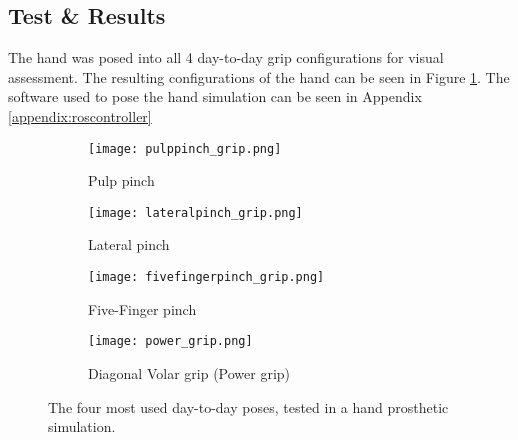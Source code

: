 \documentclass[../main.tex]{subfiles}
\begin{document}
\subsection{Test \& Results}

The hand was posed into all 4 day-to-day grip configurations for visual assessment.
The resulting configurations of the hand can be seen in Figure  \ref{fig:hand_pose_test}.
The software used to pose the hand simulation can be seen in Appendix \ref{appendix:roscontroller} 

\begin{figure}
    \centering
    \begin{subfigure}[b]{0.49\textwidth}
        \centering
        \texttt{[image: pulppinch\_grip.png]}
        \caption{Pulp pinch}
    \end{subfigure}
    \hfill
    \centering
    \begin{subfigure}[b]{0.49\textwidth}
        \centering
        \texttt{[image: lateralpinch\_grip.png]}
        \caption{Lateral pinch}
    \end{subfigure}
    \hfill
    \begin{subfigure}[b]{0.49\textwidth}
        \centering
        \texttt{[image: fivefingerpinch\_grip.png]}
        \caption{Five-Finger pinch}
    \end{subfigure}
    \hfill
    \begin{subfigure}[b]{0.49\textwidth}
        \centering
        \texttt{[image: power\_grip.png]}
        \caption{Diagonal Volar grip (Power grip)}
    \end{subfigure}
    \caption{The four most used day-to-day poses, tested in a hand prosthetic simulation.}
    \label{fig:hand_pose_test}
\end{figure}


\end{document}
